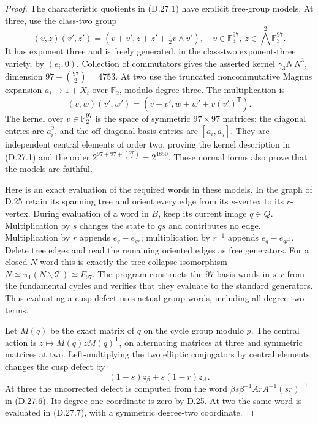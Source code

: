 \begin{proof}
The characteristic quotients in (D.27.1) have explicit
free-group models. At three, use the class-two group
\[
 (v,z)(v',z')=(v+v',z+z'+\tfrac12v\wedge v'),
 \quad v\in\mathbb F_3^{97},\ z\in\bigwedge^2\mathbb F_3^{97}.
                                                               \tag{D.27.6}
\]
It has exponent three and is freely generated, in the
class-two exponent-three variety, by $(e_i,0)$.
Collection of commutators gives the asserted kernel
$\gamma_3N\,N^3$, dimension $97+\binom{97}{2}=4753$.
At two use the truncated noncommutative Magnus expansion
$a_i\mapsto1+X_i$ over $\mathbb F_2$, modulo degree three.
The multiplication is
\[
 (v,w)(v',w')=(v+v',w+w'+v(v')^{\mathsf T}).             \tag{D.27.7}
\]
The kernel over $v\in\mathbb F_2^{97}$ is the space of
symmetric $97\times97$ matrices: the diagonal entries are
$a_i^2$, and the off-diagonal basis entries are
$[a_i,a_j]$. They are independent central elements of order
two, proving the kernel description in (D.27.1) and the
order $2^{97+97+\binom{97}{2}}=2^{4850}$.
These normal forms also prove that the models are faithful.

Here is an exact evaluation of the required words in these
models. In the graph of D.25 retain its spanning tree and
orient every edge from its $s$-vertex to its $r$-vertex.
During evaluation of a word in $B$, keep its current image
$q\in Q$. Multiplication by $s$ changes the state to $qs$
and contributes no edge. Multiplication by $r$ appends
$e_q-e_{qr}$; multiplication by $r^{-1}$ appends
$e_q-e_{qr^2}$. Delete tree edges and read the remaining
oriented edges as free generators. For a closed $N$-word
this is exactly the tree-collapse isomorphism
$N\simeq\pi_1(N\backslash\mathcal T)\simeq F_{97}$.
The program constructs the $97$ basis words in $s,r$ from
the fundamental cycles and verifies that they evaluate
to the standard generators. Thus evaluating a cusp defect
uses actual group words, including all degree-two terms.

Let $M(q)$ be the exact matrix of $q$ on the cycle group
modulo $p$. The central action is
$z\mapsto M(q)zM(q)^{\mathsf T}$, on alternating matrices
at three and symmetric matrices at two. Left-multiplying
the two elliptic conjugators by central elements changes
the cusp defect by
\[
         (1-s)z_\beta+s(1-r)z_A.                        \tag{D.27.8}
\]
At three the uncorrected defect is computed from the word
$\beta s\beta^{-1}ArA^{-1}(sr)^{-1}$ in (D.27.6).
Its degree-one coordinate is zero by D.25. At two the
same word is evaluated in (D.27.7), with a symmetric
degree-two coordinate.


\end{proof}
